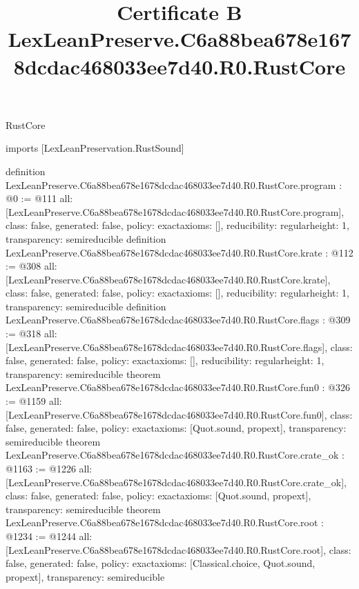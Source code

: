 \begin{lexlean}{RustCore}
\title{Certificate B LexLeanPreserve.C6a88bea678e1678dcdac468033ee7d40.R0.RustCore}
\begin{coremodule}
imports [LexLeanPreservation.RustSound]

definition LexLeanPreserve.C6a88bea678e1678dcdac468033ee7d40.R0.RustCore.program : @0 := @111 {
  all: [LexLeanPreserve.C6a88bea678e1678dcdac468033ee7d40.R0.RustCore.program],
  class: false,
  generated: false,
  policy: exact{axioms: []},
  reducibility: regular{height: 1},
  transparency: semireducible
}
definition LexLeanPreserve.C6a88bea678e1678dcdac468033ee7d40.R0.RustCore.krate : @112 := @308 {
  all: [LexLeanPreserve.C6a88bea678e1678dcdac468033ee7d40.R0.RustCore.krate],
  class: false,
  generated: false,
  policy: exact{axioms: []},
  reducibility: regular{height: 1},
  transparency: semireducible
}
definition LexLeanPreserve.C6a88bea678e1678dcdac468033ee7d40.R0.RustCore.flags : @309 := @318 {
  all: [LexLeanPreserve.C6a88bea678e1678dcdac468033ee7d40.R0.RustCore.flags],
  class: false,
  generated: false,
  policy: exact{axioms: []},
  reducibility: regular{height: 1},
  transparency: semireducible
}
theorem LexLeanPreserve.C6a88bea678e1678dcdac468033ee7d40.R0.RustCore.fun0 : @326 := @1159 {
  all: [LexLeanPreserve.C6a88bea678e1678dcdac468033ee7d40.R0.RustCore.fun0],
  class: false,
  generated: false,
  policy: exact{axioms: [Quot.sound, propext]},
  transparency: semireducible
}
theorem LexLeanPreserve.C6a88bea678e1678dcdac468033ee7d40.R0.RustCore.crate_ok : @1163 := @1226 {
  all: [LexLeanPreserve.C6a88bea678e1678dcdac468033ee7d40.R0.RustCore.crate_ok],
  class: false,
  generated: false,
  policy: exact{axioms: [Quot.sound, propext]},
  transparency: semireducible
}
theorem LexLeanPreserve.C6a88bea678e1678dcdac468033ee7d40.R0.RustCore.root : @1234 := @1244 {
  all: [LexLeanPreserve.C6a88bea678e1678dcdac468033ee7d40.R0.RustCore.root],
  class: false,
  generated: false,
  policy: exact{axioms: [Classical.choice, Quot.sound, propext]},
  transparency: semireducible
}


\end{coremodule}
\end{lexlean}
